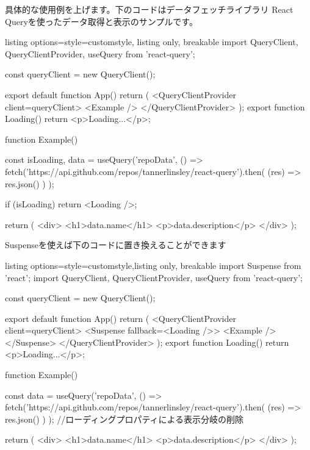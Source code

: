 具体的な使用例を上げます。下のコードはデータフェッチライブラリ React Queryを使ったデータ取得と表示のサンプルです。






\begin{tcblisting}{listing options={style=customstyle}, listing only, breakable}
  import { QueryClient, QueryClientProvider, useQuery } from 'react-query';

  const queryClient = new QueryClient();

  export default function App() {
  return (
  <QueryClientProvider client={queryClient}>
  <Example />
  </QueryClientProvider>
  );
  }
  export function Loading() {
      return <p>Loading...</p>;
    }

  function Example() {
      const { isLoading, data } = useQuery('repoData', () =>
      fetch('https://api.github.com/repos/tannerlinsley/react-query').then(
      (res) => res.json()
      )
      );

      if (isLoading) return <Loading />;

      return (
      <div>
        <h1>{data.name}</h1>
        <p>{data.description}</p>
      </div>
      );
    }
\end{tcblisting}




Suspenseを使えば下のコードに置き換えることができます


\begin{tcblisting}{listing options={style=customstyle},listing only, breakable}
  import { Suspense } from 'react';
  import { QueryClient, QueryClientProvider, useQuery } from 'react-query';

  const queryClient = new QueryClient();

  export default function App() {
  return (
  <QueryClientProvider client={queryClient}>
  <Suspense fallback={<Loading />}>
  <Example />
  </Suspense>
  </QueryClientProvider>
  );
  }
  export function Loading() {
      return <p>Loading...</p>;
    }

  function Example() {
      const { data } = useQuery('repoData', () =>
      fetch('https://api.github.com/repos/tannerlinsley/react-query').then(
      (res) => res.json()
      )
      );
      //ローディングプロパティによる表示分岐の削除

      return (
      <div>
        <h1>{data.name}</h1>
        <p>{data.description}</p>
      </div>
      );
    }
\end{tcblisting}






